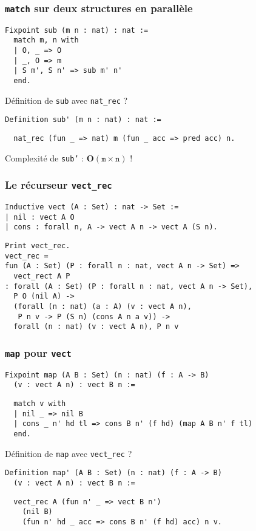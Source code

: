 \documentclass{beamer}
\begin{document}
\begin{frame}[fragile]
  \frametitle{\texttt{match} sur deux structures en parallèle}

\begin{verbatim}
Fixpoint sub (m n : nat) : nat :=
  match m, n with
  | O, _ => O
  | _, O => m
  | S m', S n' => sub m' n'
  end.
\end{verbatim}
\vfill
Définition de \texttt{sub} avec \texttt{nat_rec} ?
\begin{verbatim}
Definition sub' (m n : nat) : nat :=
\end{verbatim}
\pause
\begin{verbatim}
  nat_rec (fun _ => nat) m (fun _ acc => pred acc) n.
\end{verbatim}
\vfill
Complexité de \texttt{sub'} : \(\mathbf O(\texttt{m} \times \texttt{n})\) !
\end{frame}

\begin{frame}[fragile]
  \frametitle{Le récurseur \texttt{vect_rec}}

\begin{verbatim}
Inductive vect (A : Set) : nat -> Set :=
| nil : vect A O
| cons : forall n, A -> vect A n -> vect A (S n).
\end{verbatim}

\begin{verbatim}
Print vect_rec.
vect_rec =
fun (A : Set) (P : forall n : nat, vect A n -> Set) =>
  vect_rect A P
: forall (A : Set) (P : forall n : nat, vect A n -> Set),
  P O (nil A) ->
  (forall (n : nat) (a : A) (v : vect A n),
   P n v -> P (S n) (cons A n a v)) ->
  forall (n : nat) (v : vect A n), P n v
\end{verbatim}
\end{frame}

\begin{frame}[fragile]
  \frametitle{\texttt{map} pour \texttt{vect}}

\begin{verbatim}
Fixpoint map (A B : Set) (n : nat) (f : A -> B)
  (v : vect A n) : vect B n :=
\end{verbatim}
\pause
\begin{verbatim}
  match v with
  | nil _ => nil B
  | cons _ n' hd tl => cons B n' (f hd) (map A B n' f tl)
  end.
\end{verbatim}
\vfill
Définition de \texttt{map} avec \texttt{vect_rec} ?
\begin{verbatim}
Definition map' (A B : Set) (n : nat) (f : A -> B)
  (v : vect A n) : vect B n :=
\end{verbatim}
\pause
\begin{verbatim}
  vect_rec A (fun n' _ => vect B n')
    (nil B)
    (fun n' hd _ acc => cons B n' (f hd) acc) n v.
\end{verbatim}
\end{frame}
\end{document}

